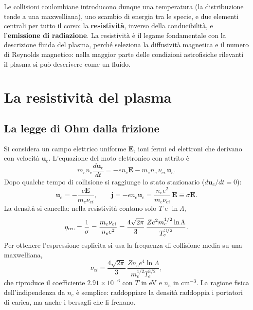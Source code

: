Le collisioni coulombiane introducono dunque una temperatura (la distribuzione tende a una maxwelliana), uno scambio di energia tra le specie, e due elementi centrali per tutto il corso: la \textbf{resistività}, inverso della conducibilità, e l'\textbf{emissione di radiazione}.
La resistività è il legame fondamentale con la descrizione fluida del plasma, perché seleziona la diffusività magnetica e il numero di Reynolds magnetico: nella maggior parte delle condizioni astrofisiche rilevanti il plasma si può descrivere come un fluido.

\section{La resistività del plasma}

\subsection{La legge di Ohm dalla frizione}
Si considera un campo elettrico uniforme $\mathbf{E}$, ioni fermi ed elettroni che derivano con velocità $\mathbf{u}_e$. L'equazione del moto elettronico con attrito è
\begin{equation}
m_en_e\frac{d\mathbf{u}_e}{dt}=-en_e\mathbf{E}-m_en_e\,\nu_{ei}\,\mathbf{u}_e .
\end{equation}
Dopo qualche tempo di collisione si raggiunge lo stato stazionario ($d\mathbf{u}_e/dt=0$):
\begin{equation}
\mathbf{u}_e=-\frac{e\mathbf{E}}{m_e\nu_{ei}},\qquad \mathbf{j}=-en_e\mathbf{u}_e=\frac{n_ee^2}{m_e\nu_{ei}}\,\mathbf{E}\equiv\sigma\mathbf{E} .
\end{equation}
La densità si cancella: nella resistività contano solo $T$ e $\ln\Lambda$,
\begin{equation}
\eta_{\rm res}=\frac{1}{\sigma}=\frac{m_e\nu_{ei}}{n_ee^2}=\frac{4\sqrt{2\pi}}{3}\,\frac{Ze^2m_e^{1/2}\ln\Lambda}{T_e^{3/2}} .
\end{equation}
Per ottenere l'espressione esplicita si usa la frequenza di collisione media su una maxwelliana,
\begin{equation}
\nu_{ei}=\frac{4\sqrt{2\pi}}{3}\,\frac{Zn_ee^4\ln\Lambda}{m_e^{1/2}T_e^{3/2}},
\end{equation}
che riproduce il coefficiente $2.91\times10^{-6}$ con $T$ in eV e $n_e$ in $\mathrm{cm^{-3}}$.
La ragione fisica dell'indipendenza da $n_e$ è semplice: raddoppiare la densità raddoppia i portatori di carica, ma anche i bersagli che li frenano.

